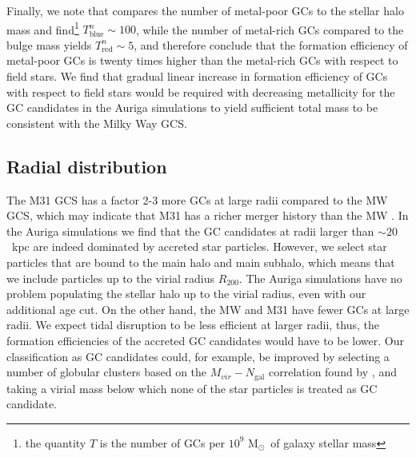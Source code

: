 \documentclass[a4paper,fleqn,usenatbib]{mnras}
\newcommand{\Sun}[0]{\ensuremath{_{\odot}}}
\begin{document}
Finally, we note that \citet{2006ARA&A..44..193B} compares the number of metal-poor 
GCs to the stellar halo mass and find\footnote{the quantity $T$ is the number of 
GCs per $10^9$ M\Sun \, of galaxy stellar mass} $T^n_{\text{blue}} \sim 100$, 
while the number of metal-rich GCs compared to the bulge mass yields 
$T^n_{\text{red}} \sim 5$, and therefore conclude that the formation efficiency
of metal-poor GCs is twenty times higher than the metal-rich GCs with respect to 
field stars. We find that gradual linear increase in formation efficiency of GCs
with respect to field stars would be required with decreasing metallicity for
the GC candidates in the Auriga simulations to yield sufficient total mass to
be consistent with the Milky Way GCS.

\subsection{Radial distribution}
\label{sec:discussion_Rgc}
The M31 GCS has a factor 2-3 more GCs at large radii compared to the MW GCS,
which may indicate that M31 has a richer merger history than the MW 
\citep{2016ApJ...824...42C}. In the Auriga simulations we find that the GC 
candidates at radii larger than ${\sim}20$~kpc are indeed dominated by accreted
star particles. However, we select star particles that are bound to the main 
halo and main subhalo, which means that we include particles up to the virial 
radius $R_{200}$. The Auriga simulations have no problem populating the stellar 
halo up to the virial radius, even with our additional age cut. On the other hand, 
the MW and M31 have fewer GCs at large radii. We expect tidal disruption to be
less efficient at larger radii, thus, the formation efficiencies of the accreted 
GC candidates would have to be lower. Our classification as GC candidates could, 
for example, be improved by selecting a number of globular clusters based on the 
$M_{vir}-N_{\text{gal}}$ correlation found by \citet{2019arXiv190100900B}, and 
taking a virial mass below which none of the star particles is treated as GC candidate.

\end{document}
